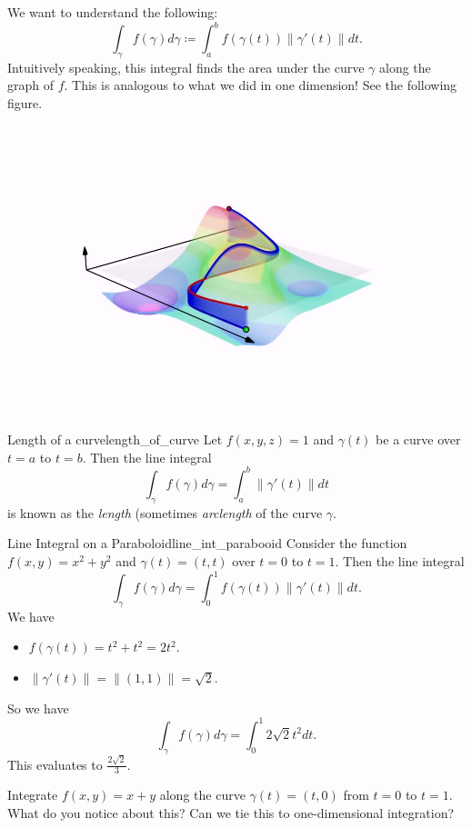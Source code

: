         We want to understand the following:
        \[
        \int_\gamma f(\gamma)d\gamma \coloneqq \int_a^b f(\gamma(t))\|\gamma'(t)\|dt.
        \]
        Intuitively speaking, this integral finds the area under the curve $\gamma$ along the graph of $f$.  This is analogous to what we did in one dimension! See the following figure.
        \begin{figure}[H]
            \centering
            \includegraphics[width=.5\textwidth]{Figures_Part_6/Line_integral_of_scalar_field.jpg}
        \end{figure}
        
        \begin{ex}{Length of a curve}{length_of_curve}
        Let $f(x,y,z)=1$ and $\gamma(t)$ be a curve over $t=a$ to $t=b$.  Then the line integral
        \[
        \int_\gamma f(\gamma)d\gamma = \int_a^b \|\gamma'(t)\|dt
        \]
        is known as the \emph{length} (sometimes \emph{arclength} of the curve $\gamma$.
        \end{ex}
        
        \begin{ex}{Line Integral on a Paraboloid}{line_int_parabooid}
        Consider the function $f(x,y)=x^2+y^2$ and $\gamma(t)=(t,t)$ over $t=0$ to $t=1$.  Then the line integral
        \[
        \int_\gamma f(\gamma)d\gamma = \int_0^1 f(\gamma(t))\|\gamma'(t)\|dt.
        \]
        We have
        \begin{itemize}
            \item $f(\gamma(t))=t^2+t^2=2t^2.$
            \item $\|\gamma'(t)\|=\|(1,1)\|=\sqrt{2}.$
        \end{itemize}
        So we have
        \[
        \int_\gamma f(\gamma)d\gamma = \int_0^1 2\sqrt{2}t^2dt.
        \]
        This evaluates to $\frac{2\sqrt{2}}{3}$.
        \end{ex}
        
        \begin{exercise}
        Integrate $f(x,y)=x+y$ along the curve $\gamma(t)=(t,0)$ from $t=0$ to $t=1$. What do you notice about this? Can we tie this to one-dimensional integration?
        \end{exercise}
        
